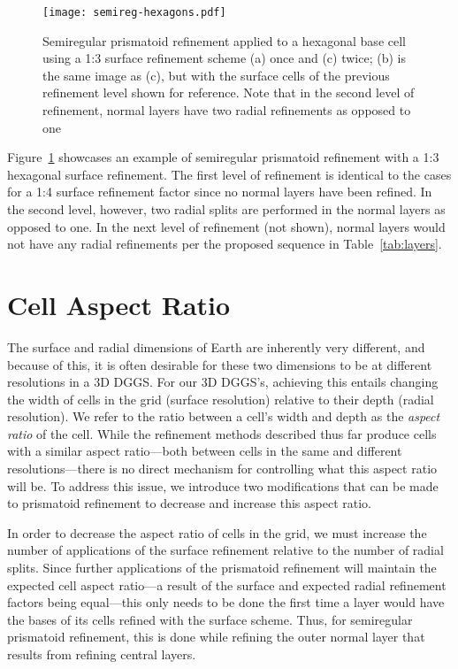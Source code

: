 \begin{figure}[ht!]
	\centering
	\texttt{[image: semireg-hexagons.pdf]}
	\caption[Semiregular prismatoid refinement for hexagons]{
		Semiregular prismatoid refinement applied to a hexagonal base cell using a 1:3 surface refinement scheme (a) once and (c) twice; (b) is the same image as (c), but with the surface cells of the previous refinement level shown for reference.
		Note that in the second level of refinement, normal layers have two radial refinements as opposed to one
	}
	\label{fig:hexagons}
\end{figure}


Figure~\ref{fig:hexagons} showcases an example of semiregular prismatoid refinement with a 1:3 hexagonal surface refinement.
The first level of refinement is identical to the cases for a 1:4 surface refinement factor since no normal layers have been refined.
In the second level, however, two radial splits are performed in the normal layers as opposed to one.
In the next level of refinement (not shown), normal layers would not have any radial refinements per the proposed sequence in Table~\ref{tab:layers}.


\section{Cell Aspect Ratio} \label{chap:5:ar}
The surface and radial dimensions of Earth are inherently very different, and because of this, it is often desirable for these two dimensions to be at different resolutions in a 3D DGGS.
For our 3D DGGS's, achieving this entails changing the width of cells in the grid (surface resolution) relative to their depth (radial resolution).
We refer to the ratio between a cell's width and depth as the \textit{aspect ratio} of the cell.
While the refinement methods described thus far produce cells with a similar aspect ratio---both between cells in the same and different resolutions---there is no direct mechanism for controlling what this aspect ratio will be.
To address this issue, we introduce two modifications that can be made to prismatoid refinement to decrease and increase this aspect ratio.


In order to decrease the aspect ratio of cells in the grid, we must increase the number of applications of the surface refinement relative to the number of radial splits.
Since further applications of the prismatoid refinement will maintain the expected cell aspect ratio---a result of the surface and expected radial refinement factors being equal---this only needs to be done the first time a layer would have the bases of its cells refined with the surface scheme.
Thus, for semiregular prismatoid refinement, this is done while refining the outer normal layer that results from refining central layers.


